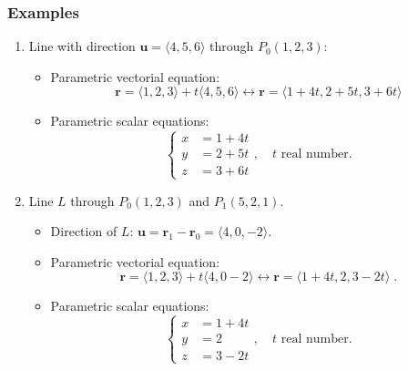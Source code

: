 \begin{frame}
\frametitle{Examples}

\begin{enumerate}
  \item Line with direction $\textbf{u} = \langle 4,5,6\rangle$ through $P_0(1,2,3)$:
\begin{itemize}
 \item Parametric vectorial equation:
%
$$\textbf{r} = \langle 1,2,3\rangle + t \langle 4,5,6\rangle \leftrightarrow
\textbf{r} = \langle 1+4t, 2+5t, 3+6t\rangle$$
%
\item Parametric scalar equations:
%
$$\left\{ \begin{array}{ll}
           x & = 1 + 4t \\
	   y & = 2+5t \\
           z & = 3+6t
          \end{array}
\right. , \quad t \text{ real number.}$$
\end{itemize}
%
\item Line $L$ through $P_0(1,2,3)$ and $P_1(5,2,1)$.

\begin{itemize}
 \item Direction of $L$: $\textbf{u} = \textbf{r}_1-\textbf{r}_0 = \langle 4, 0, -2\rangle$.
\item Parametric vectorial equation:
%
$$\textbf{r} = \langle 1,2,3\rangle + t \langle 4, 0 -2\rangle \leftrightarrow \textbf{r} = \langle 1+4t, 2, 3-2t\rangle\; .$$
%
\item Parametric scalar equations:
$$\left\{ \begin{array}{ll}
           x & = 1+4t \\
	   y & = 2 \\
           z & = 3-2t
          \end{array}
\right. , \quad t \text{ real number.}$$
\end{itemize}
\end{enumerate}

\end{frame}


